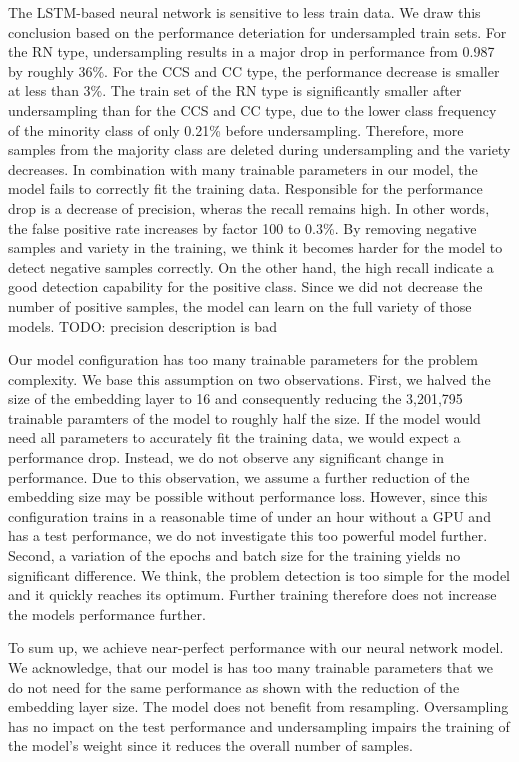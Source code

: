 The LSTM-based neural network is sensitive to less train data. We draw this conclusion based on the performance deteriation for undersampled train sets. For the RN type, undersampling results in a major drop in performance from 0.987 by roughly 36\%. For the CCS and CC type, the performance decrease is smaller at less than 3\%. The train set of the RN type is significantly smaller after undersampling than for the CCS and CC type, due to the lower class frequency of the minority class of only 0.21\% before undersampling. Therefore, more samples from the majority class are deleted during undersampling and the variety decreases. In combination with many trainable parameters in our model, the model fails to correctly fit the training data. 
Responsible for the performance drop is a decrease of precision, wheras the recall remains high. In other words, the false positive rate increases by factor 100 to 0.3\%. By removing negative samples and variety in the training, we think it becomes harder for the model to detect negative samples correctly. On the other hand, the high recall indicate a good detection capability for the positive class. Since we did not decrease the number of positive samples, the model can learn on the full variety of those models. TODO: precision description is bad


Our model configuration has too many trainable parameters for the problem complexity. We base this assumption on two observations. First, we halved the size of the embedding layer to 16 and consequently reducing the 3,201,795 trainable paramters of the model to roughly half the size. If the model would need all parameters to accurately fit the training data, we would expect a performance drop. Instead, we do not observe any significant change in performance. Due to this observation, we assume a further reduction of the embedding size may be possible without performance loss. However, since this configuration trains in a reasonable time of under an hour without a GPU and has a test performance, we do not investigate this too powerful model further.
Second, a variation of the epochs and batch size for the training yields no significant difference. We think, the problem detection is too simple for the model and it quickly reaches its optimum. Further training therefore does not increase the models performance further. 


To sum up, we achieve near-perfect performance with our neural network model. We acknowledge, that our model is has too many trainable parameters that we do not need for the same performance as shown with the reduction of the embedding layer size. The model does not benefit from resampling. Oversampling has no impact on the test performance and undersampling impairs the training of the model's weight since it reduces the overall number of samples.

